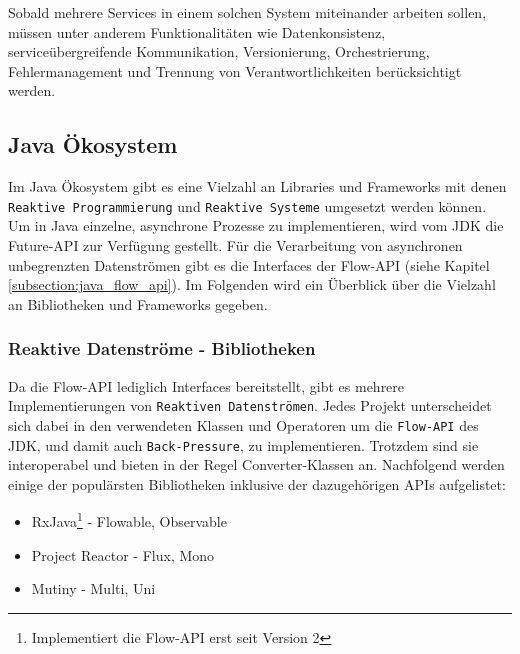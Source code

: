 Sobald mehrere Services in einem solchen System miteinander arbeiten sollen, müssen unter anderem Funktionalitäten wie
Datenkonsistenz, serviceübergreifende Kommunikation, Versionierung, Orchestrierung, Fehlermanagement und Trennung von Verantwortlichkeiten
berücksichtigt werden.

\subsection{Java Ökosystem}
\label{subsec:java_ökosystem}
Im Java Ökosystem gibt es eine Vielzahl an Libraries und Frameworks mit denen
\verb|Reaktive Programmierung| und \verb|Reaktive Systeme| umgesetzt werden können.
Um in Java einzelne, asynchrone Prozesse zu implementieren, wird vom JDK die Future-API zur Verfügung gestellt.\parencite{OracleFuture}
Für die Verarbeitung von asynchronen unbegrenzten Datenströmen gibt es die Interfaces der Flow-API (siehe Kapitel \ref{subsection:java_flow_api}).
\parencite{OracleFlow}
Im Folgenden wird ein Überblick über die Vielzahl an Bibliotheken und Frameworks gegeben.
\subsubsection{Reaktive Datenströme - Bibliotheken}
\label{subsubsec:reactive_streams}
Da die Flow-API lediglich Interfaces bereitstellt, gibt es mehrere Implementierungen von \verb|Reaktiven Datenströmen|.
Jedes Projekt unterscheidet sich dabei in den verwendeten Klassen und Operatoren um die \verb|Flow-API| des JDK, und damit auch \verb|Back-Pressure|,
zu implementieren. Trotzdem sind sie interoperabel und bieten in der Regel Converter-Klassen an.
Nachfolgend werden einige der populärsten Bibliotheken inklusive der dazugehörigen APIs aufgelistet:
\begin{itemize}
  \item RxJava\footnote{Implementiert die Flow-API erst seit Version 2} - Flowable, Observable \parencite{RxJava}
  \item Project Reactor - Flux, Mono \parencite{ProjectReactor}
  \item Mutiny - Multi, Uni \parencite{Mutiny}
\end{itemize}

